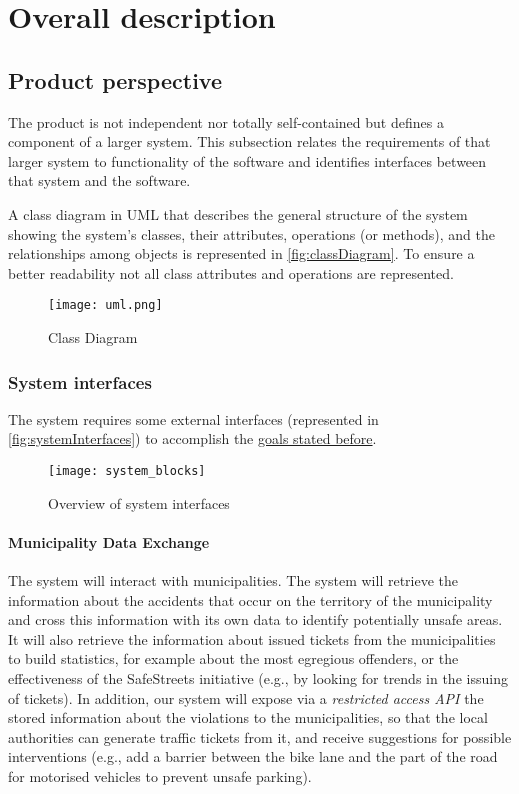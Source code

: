 \section{Overall description}

\subsection{Product perspective}
	
	The product is not independent nor totally self-contained but defines a component of a larger system. This subsection relates the requirements of that larger system to functionality of the software and identifies interfaces between that system and the software.
	
	A class diagram in UML that describes the general structure of the system showing the system's classes, their attributes, operations (or methods), and the relationships among objects is represented in \autoref{fig:classDiagram}. To ensure a better readability not all class attributes and operations are represented. \newline \newline
		
	\begin{figure}[h]
			\centering
			\texttt{[image: uml.png]}
			\caption{
				\label{fig:classDiagram} 
				Class Diagram
			}
		\end{figure}

	\subsubsection{System interfaces}
	\label{sec:systemInterfaces}
		The system requires some external interfaces (represented in \autoref{fig:systemInterfaces}) to accomplish the \hyperref[sec:goals]{goals stated before}. \newline \newline
		\begin{figure}[h]
			\centering
			\texttt{[image: system\_blocks]}
			\caption{
				\label{fig:systemInterfaces} 
				Overview of system interfaces
			}
		\end{figure} 
\clearpage			
\paragraph{Municipality Data Exchange} The system will interact with municipalities. The system will retrieve the information about the accidents that occur on the territory of the municipality and cross this information with its own data to identify potentially unsafe areas. It will also retrieve the information about issued tickets from the municipalities to build statistics, for example about the most egregious offenders, or the effectiveness of the SafeStreets initiative (e.g., by looking for trends in the issuing of tickets). In addition, our system will expose via a \emph{restricted access API} the stored information about the violations to the municipalities, so that the local authorities can generate traffic tickets from it, and receive suggestions for possible interventions (e.g., add a barrier between the bike lane and the part of the road for motorised vehicles to prevent unsafe parking). 
		
